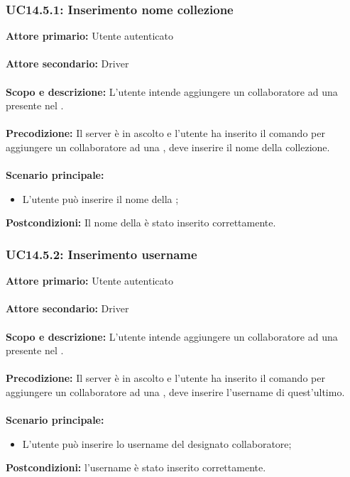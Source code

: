 \documentclass{scalatekids-article}
\begin{document}
\subsubsection{UC14.5.1: Inserimento nome collezione}

\textbf{Attore primario:} Utente autenticato\\ \\
\textbf{Attore secondario:} Driver\\ \\
\textbf{Scopo e descrizione:} L’utente intende aggiungere un collaboratore ad una  presente nel .\\ \\
\textbf{Precodizione:} Il server è in ascolto e l’utente ha inserito il comando per aggiungere un collaboratore ad una , deve inserire il nome della collezione.\\ \\
\textbf{Scenario principale:}
\begin{itemize}
\item L'utente può inserire il nome della ;
\end{itemize}
\textbf{Postcondizioni:} Il nome della  è stato inserito correttamente.

\subsubsection{UC14.5.2: Inserimento username}

\textbf{Attore primario:} Utente autenticato\\ \\
\textbf{Attore secondario:} Driver\\ \\
\textbf{Scopo e descrizione:} L’utente intende aggiungere un collaboratore ad una  presente nel .\\ \\
\textbf{Precodizione:} Il server è in ascolto e l’utente ha inserito il comando per aggiungere un collaboratore ad una , deve inserire l'username di quest'ultimo.\\ \\
\textbf{Scenario principale:}
\begin{itemize}
\item L'utente può inserire lo username del designato collaboratore;
\end{itemize}
\textbf{Postcondizioni:} l'username è stato inserito correttamente.
\end{document}
